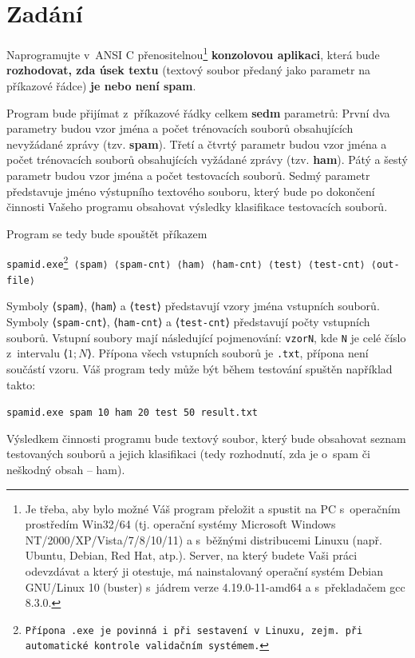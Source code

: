 \documentclass[a4paper, 12pt]{report}
\begin{document}
\chapter{Zadání}

Naprogramujte v~ANSI C přenositelnou\footnote{Je třeba, aby bylo možné Váš 
program přeložit a spustit na PC s~operačním prostředím Win32/64 (tj. 
operační systémy Microsoft Windows NT/2000/XP/Vista/7/8/10/11) a s~běžnými 
distribucemi Linuxu (např. Ubuntu, Debian, Red Hat, atp.). Server, na 
který budete Vaši práci odevzdávat a který ji otestuje, má nainstalovaný 
operační systém Debian GNU/Linux 10 (buster) s~jádrem verze 
4.19.0-11-amd64 a s~překladačem gcc 8.3.0.} \textbf{konzolovou aplikaci}, 
která bude \textbf{rozhodovat, zda úsek textu} (textový soubor předaný 
jako parametr na příkazové řádce) \textbf{je nebo není spam}.

Program bude přijímat z~příkazové řádky celkem \textbf{sedm} parametrů: 
První dva parametry budou vzor jména a počet trénovacích souborů 
obsahujících nevyžádané zprávy (tzv. \textbf{spam}). Třetí a čtvrtý 
parametr budou vzor jména a počet trénovacích souborů obsahujících 
vyžádané zprávy (tzv. \textbf{ham}). Pátý a šestý parametr budou vzor 
jména a počet testovacích souborů. Sedmý parametr představuje jméno 
výstupního textového souboru, který bude po dokončení činnosti Vašeho 
programu obsahovat výsledky klasifikace testovacích souborů.

Program se tedy bude spouštět příkazem

\texttt{spamid.exe\footnote{Přípona \texttt{.exe} je povinná i při 
sestavení v~Linuxu, zejm. při automatické kontrole validačním systémem.} 
⟨spam⟩ ⟨spam-cnt⟩ ⟨ham⟩ ⟨ham-cnt⟩ ⟨test⟩ ⟨test-\linebreak cnt⟩ ⟨out-file⟩}

Symboly ⟨\texttt{spam}⟩, ⟨\texttt{ham}⟩ a ⟨\texttt{test}⟩ představují 
vzory jména vstupních souborů. Symboly ⟨\texttt{spam-cnt}⟩, 
⟨\texttt{ham-cnt}⟩ a ⟨\texttt{test-cnt}⟩ představují počty vstupních 
souborů. Vstupní soubory mají následující pojmenování: \texttt{vzorN}, kde 
\texttt{N} je celé číslo z~intervalu ⟨$1;N$⟩. Přípona všech vstupních 
souborů je \texttt{.txt}, přípona není součástí vzoru. Váš program tedy 
může být během testování spuštěn například takto:

\texttt{spamid.exe spam 10 ham 20 test 50 result.txt}

Výsledkem činnosti programu bude textový soubor, který bude obsahovat 
seznam testovaných souborů a jejich klasifikaci (tedy rozhodnutí, zda je
o~spam či neškodný obsah – ham).
\end{document}
